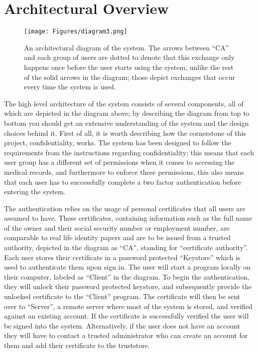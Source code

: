 \documentclass{article}
\begin{document}

\section*{Architectural Overview}

\begin{figure}[h!]
    \centering
    \texttt{[image: Figures/diagram3.png]}
    \caption{An architectural diagram of the system. The arrows between “CA” and each group of users are dotted to denote that this exchange only happens once before the user starts using the system, unlike the rest of the solid arrows in the diagram; those depict exchanges that occur every time the system is used.}
    \label{fig:diagram}
\end{figure}

The high level architecture of the system consists of several components, all of which are 
depicted in the diagram above; by describing the diagram from top to bottom you should get an extensive understanding of the system and the design choices behind it. First of all, it is worth describing how the cornerstone of this project, confidentiality, works. The system has been designed to follow the requirements from the instructions regarding confidentiality; this means that each user group has a different set of permissions when it comes to accessing the medical records, and furthermore to enforce these permissions, this also means that each user has to successfully complete a two factor authentication before entering the system.

The authentication relies on the usage of personal certificates that all users are assumed to have. These certificates, containing information such as the full name of the owner and their social security number or employment number, are comparable to real life identity papers and are to be issued from a trusted authority, depicted in the diagram as “CA”, standing for “certificate authority”. Each user stores their certificate in a password protected “Keystore” which is used to authenticate them upon sign in. The user will start a program locally on their computer, labeled as “Client” in the diagram. To begin the authentication, they will unlock their password protected keystore, and subsequently provide the unlocked certificate to the “Client” program. The certificate will then be sent over to “Server”, a remote server where most of the system is stored, and verified against an existing account. If the certificate is successfully verified the user will be signed into the system. Alternatively, if the user does not have an account they will have to contact a trusted administrator who can create an account for them and add their certificate to the truststore. 
\end{document}
